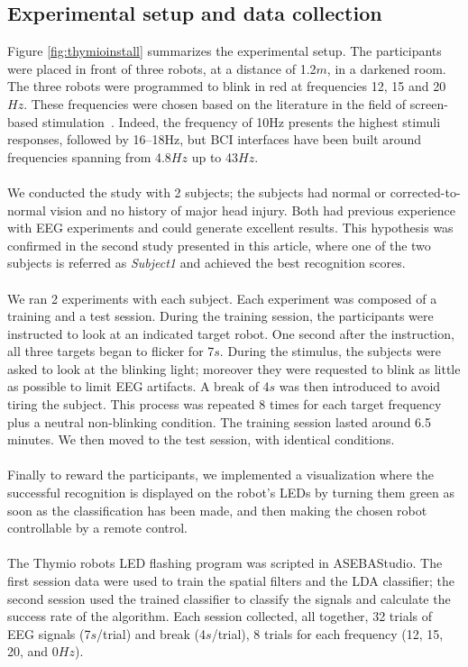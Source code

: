 \documentclass[smallextended]{svjour3}
\begin{document}
\subsection{Experimental setup and data collection}
Figure \ref{fig:thymioinstall} summarizes the experimental setup. The participants were placed in front of three robots, at a distance of 1.2$m$, in a darkened room. The three robots were programmed to blink in red at frequencies 12, 15 and 20$Hz$. These frequencies were chosen based on the literature in the field of screen-based stimulation~\cite{Zhu2010}. Indeed, the frequency of 10Hz presents the highest stimuli responses, followed by 16–18Hz, but BCI interfaces have been built around frequencies spanning from 4.8$Hz$ up to 43$Hz$.\\
\\
We conducted the study with 2 subjects; the subjects had normal or corrected-to-normal vision and no history of major head injury. Both had previous experience with EEG experiments and could generate excellent results. This hypothesis was confirmed in the second study presented in this article, where one of the two subjects is referred as \textit{Subject1} and achieved the best recognition scores. \\
\\
We ran 2 experiments with each subject. Each experiment was composed of a training and a test session. During the training session, the participants were instructed to look at an indicated target robot. One second after the instruction, all three targets began to flicker for 7$s$. During the stimulus, the subjects were asked to look at the blinking light; moreover they were requested to blink as little as possible to limit EEG artifacts. A break of 4$s$ was then introduced to avoid tiring the subject. This process was repeated 8 times for each target frequency plus a neutral non-blinking condition. The training session lasted around 6.5 minutes. We then moved to the test session, with identical conditions.\\
\\
Finally to reward the participants, we implemented a visualization where the successful recognition is displayed on the robot's LEDs by turning them green as soon as the classification has been made, and then making the chosen robot controllable by a remote control.\\
\\
The Thymio robots LED flashing program was scripted in ASEBAStudio. The first session data were used to train the spatial filters and the LDA classifier; the second session used the trained classifier to classify the signals and calculate the success rate of the algorithm. Each session collected, all together, 32 trials of EEG signals (7$s$/trial) and break (4$s$/trial), 8 trials for each frequency (12, 15, 20, and 0$Hz$). 
\end{document}
